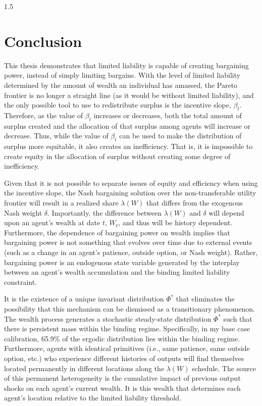 \documentclass[12pt]{article}
\theoremstyle{definition}
\theoremstyle{plain}
\begin{document}
\begin{spacing}{1.5}
\section{Conclusion}\label{Conclusion}
This thesis demonstrates that limited liability is capable of creating bargaining 
power, instead of simply limiting bargains. With the level of limited liability determined 
by the amount of wealth an individual has amassed, the Pareto frontier is no longer a 
straight line (as it would be without limited liability), and the only possible tool to 
use to redistribute surplus is the incentive slope, $\beta_t$. Therefore, as the value 
of $\beta_t$ increases or decreases, both the total amount of surplus created and the 
allocation of that surplus among agents will increase or decrease. Thus, while the value 
of $\beta_t$ can be used to make the distribution of surplus more equitable, it also 
creates an inefficiency. That is, it is impossible to create equity in the allocation of 
surplus without creating some degree of inefficiency.

Given that it is not possible to separate issues of equity and efficiency when using the 
incentive slope, the Nash bargaining solution over the non-transferable utility frontier 
will result in a realized share $\lambda(W)$ that differs from the exogenous Nash weight 
$\delta$. Importantly, the difference between $\lambda(W)$ and $\delta$ will depend upon 
an agent's wealth at date $t$, $W_t$, and thus will be history dependent. Furthermore, 
the dependence of bargaining power on wealth implies that bargaining power is not 
something that evolves over time due to external events (such as a change in an agent's 
patience, outside option, or Nash weight). Rather, bargaining power is an endogenous 
state variable generated by the interplay between an agent's wealth accumulation and the 
binding limited liability constraint.

It is the existence of a unique invariant distribution $\Phi^*$ that eliminates the 
possibility that this mechanism can be dismissed as a transitionary phenomenon. The 
wealth process generates a stochastic steady-state distribution $\Phi^*$ such that there 
is persistent mass within the binding regime. Specifically, in my base case calibration, 
65.9\% of the ergodic distribution lies within the binding regime. Furthermore, agents 
with identical primitives (i.e., same patience, same outside option, etc.) who experience 
different histories of outputs will find themselves located permanently in different 
locations along the $\lambda(W)$ schedule. The source of this permanent heterogeneity is 
the cumulative impact of previous output shocks on each agent's current wealth. It is 
this wealth that determines each agent's location relative to the limited liability 
threshold.


\end{spacing}
\end{document}
